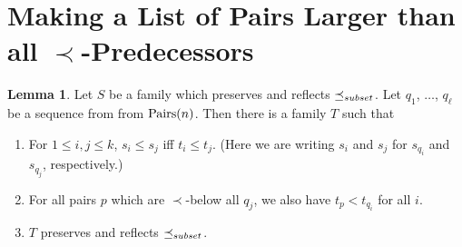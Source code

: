 \documentclass[12pt]{article}
\theoremstyle{definition}
\newtheorem{lemma}[theorem]{Lemma}
\begin{document}
\section{Making a List of Pairs Larger than all $\prec$-Predecessors}

\begin{lemma}
Let $S$ be a family which  preserves and reflects $\preceq_{\scriptsize subset}$.  
Let $q_1$, $\ldots$, $q_{\ell}$ be a sequence from 
from $\mbox{Pairs}(n)$.  
Then there is a family $T$ such that
\begin{enumerate} 
    \item For $1\leq i,j \leq k$, $s_i \leq s_j$ iff $t_i \leq t_j$.
    (Here we are writing $s_i$ and $s_j$ for $s_{q_i}$ and $s_{q_j}$, respectively.)
    \label{competitor1}
    \item For all 
pairs $p $ which are $\prec$-below all $q_j$, we also have 
$t_{p}  <  t_{q_i}$ for all $i$.
\label{competitor2}
  \item $T$ preserves and reflects $\preceq_{\scriptsize subset}$. 

\end{enumerate}
\label{lemma-competitor-subset}
\end{lemma}
 
\end{document}
